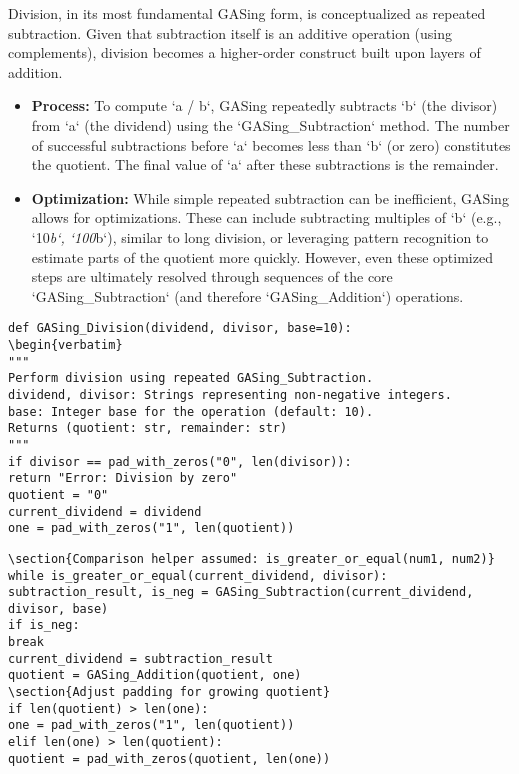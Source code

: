 Division, in its most fundamental GASing form, is conceptualized as repeated subtraction. Given that subtraction itself is an additive operation (using complements), division becomes a higher-order construct built upon layers of addition.
\begin{itemize}
\item \textbf{Process:} To compute `a / b`, GASing repeatedly subtracts `b` (the divisor) from `a` (the dividend) using the `GASing_Subtraction` method. The number of successful subtractions before `a` becomes less than `b` (or zero) constitutes the quotient. The final value of `a` after these subtractions is the remainder.
\item \textbf{Optimization:} While simple repeated subtraction can be inefficient, GASing allows for optimizations. These can include subtracting multiples of `b` (e.g., `10\textit{b`, `100}b`), similar to long division, or leveraging pattern recognition to estimate parts of the quotient more quickly. However, even these optimized steps are ultimately resolved through sequences of the core `GASing_Subtraction` (and therefore `GASing_Addition`) operations.

\end{itemize}
\begin{verbatim}
def GASing_Division(dividend, divisor, base=10):
\begin{verbatim}
"""
Perform division using repeated GASing_Subtraction.
dividend, divisor: Strings representing non-negative integers.
base: Integer base for the operation (default: 10).
Returns (quotient: str, remainder: str)
"""
if divisor == pad_with_zeros("0", len(divisor)):
return "Error: Division by zero"
quotient = "0"
current_dividend = dividend
one = pad_with_zeros("1", len(quotient))
\end{verbatim}

\begin{verbatim}
\section{Comparison helper assumed: is_greater_or_equal(num1, num2)}
while is_greater_or_equal(current_dividend, divisor):
subtraction_result, is_neg = GASing_Subtraction(current_dividend, divisor, base)
if is_neg:
break
current_dividend = subtraction_result
quotient = GASing_Addition(quotient, one)
\section{Adjust padding for growing quotient}
if len(quotient) > len(one):
one = pad_with_zeros("1", len(quotient))
elif len(one) > len(quotient):
quotient = pad_with_zeros(quotient, len(one))
\end{verbatim}

